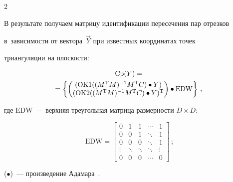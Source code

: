 \begin{multicols}{2}
  


  В результате получаем мат\-ри\-цу идентификации пересечения пар отрезков 


в~за\-ви\-си\-мости от вектора~$\vec{Y}$ при известных координатах точек 


триангуляции на плос\-кости:





\noindent


  \begin{multline}


  \mathrm{Cp}(Y)={}\\


 \!\!\hspace*{-2mm} {}=\left\{ \begin{pmatrix}


  (\mathrm{OK}1((M^{\mathrm{T}}M)^{-1}M^{\mathrm{T}}C)\bullet Y)\\


  (\mathrm{OK}2((M^{\mathrm{T}}M)^{-1} M^{\mathrm{T}} C)\bullet Y)^{\mathrm{T}}


  \end{pmatrix}\bullet \mathrm{EDW}\right\}\,,\!\!


  \label{e5-man}


  \end{multline}


где $\mathrm{EDW}$~---  верхняя треугольная мат\-ри\-ца раз\-мер\-ности $D\times D$: 





\noindent


$$


\mathrm{EDW}=\begin{bmatrix}


0&1&1&\cdots& 1\\


0&0&1&\ddots &1\\


0&0&0&\ddots &1\\


\vdots& \ddots& \ddots& \ddots&\vdots\\


0&0&0&\cdots &0


\end{bmatrix}\,;


$$


($\bullet$)~--- произведение Адамара~\cite{11-man}.






\end{multicols}

